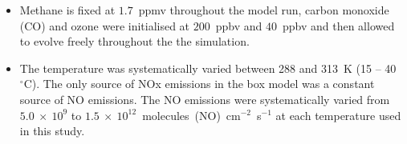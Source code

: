 \begin{itemize}
    \item Methane is fixed at $1.7$~ppmv throughout the model run, carbon monoxide (CO) and ozone were initialised at $200$~ppbv and $40$~ppbv and then allowed to evolve freely throughout the the simulation.
    \item The temperature was systematically varied between 288 and 313~K (15 -- 40~$^{\circ}$C). The only source of NOx emissions in the box model was a constant source of NO emissions. The NO emissions were systematically varied from $5.0~\times~10^9$ to $1.5~\times~10^{12}$~molecules~(NO)~cm$^{-2}$~s$^{-1}$ at each temperature used in this study. 
\end{itemize}
%        


